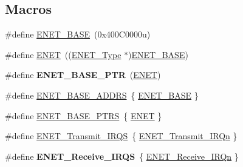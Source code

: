 \subsection*{Macros}
\begin{DoxyCompactItemize}
\item 
\#define \hyperlink{group__ENET__Peripheral__Access__Layer_gac68335c7b2279435944fe8e837aeb697}{E\+N\+E\+T\+\_\+\+B\+A\+SE}~(0x400\+C0000u)
\item 
\#define \hyperlink{group__ENET__Peripheral__Access__Layer_ga4745105f505f3ab949d6a57fbe2a0ed5}{E\+N\+ET}~((\hyperlink{structENET__Type}{E\+N\+E\+T\+\_\+\+Type} $\ast$)\hyperlink{group__ENET__Peripheral__Access__Layer_gac68335c7b2279435944fe8e837aeb697}{E\+N\+E\+T\+\_\+\+B\+A\+SE})
\item 
\#define {\bfseries E\+N\+E\+T\+\_\+\+B\+A\+S\+E\+\_\+\+P\+TR}~(\hyperlink{group__ENET__Peripheral__Access__Layer_ga4745105f505f3ab949d6a57fbe2a0ed5}{E\+N\+ET})\hypertarget{group__ENET__Peripheral__Access__Layer_gab64a2d991cc2bd76dd55ee25a52dcb5c}{}\label{group__ENET__Peripheral__Access__Layer_gab64a2d991cc2bd76dd55ee25a52dcb5c}

\item 
\#define \hyperlink{group__ENET__Peripheral__Access__Layer_ga14e5c3d5659dcf8b2cbc967aa645729e}{E\+N\+E\+T\+\_\+\+B\+A\+S\+E\+\_\+\+A\+D\+D\+RS}~\{ \hyperlink{group__ENET__Peripheral__Access__Layer_gac68335c7b2279435944fe8e837aeb697}{E\+N\+E\+T\+\_\+\+B\+A\+SE} \}
\item 
\#define \hyperlink{group__ENET__Peripheral__Access__Layer_gaa42b0a3bb4d738c4d78a36663b481ff8}{E\+N\+E\+T\+\_\+\+B\+A\+S\+E\+\_\+\+P\+T\+RS}~\{ \hyperlink{group__ENET__Peripheral__Access__Layer_ga4745105f505f3ab949d6a57fbe2a0ed5}{E\+N\+ET} \}
\item 
\#define \hyperlink{group__ENET__Peripheral__Access__Layer_ga42cb25446e48980b81b282094208c238}{E\+N\+E\+T\+\_\+\+Transmit\+\_\+\+I\+R\+QS}~\{ \hyperlink{group__Interrupt__vector__numbers_gga666eb0caeb12ec0e281415592ae89083ac4e6005822fd23a07b3f8f21833ec274}{E\+N\+E\+T\+\_\+\+Transmit\+\_\+\+I\+R\+Qn} \}
\item 
\#define {\bfseries E\+N\+E\+T\+\_\+\+Receive\+\_\+\+I\+R\+QS}~\{ \hyperlink{group__Interrupt__vector__numbers_gga666eb0caeb12ec0e281415592ae89083a870426305ade1c60a291777a76b17021}{E\+N\+E\+T\+\_\+\+Receive\+\_\+\+I\+R\+Qn} \}\hypertarget{group__ENET__Peripheral__Access__Layer_gab36042e83748d6b2571e171505777929}{}\label{group__ENET__Peripheral__Access__Layer_gab36042e83748d6b2571e171505777929}


\end{DoxyCompactItemize}
